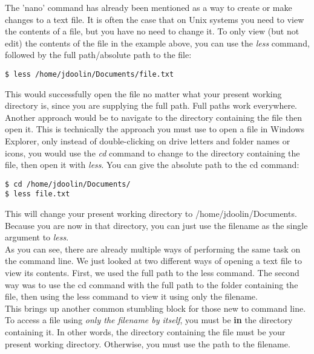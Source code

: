 The 'nano' command has already been mentioned as a way to create or make changes to a text file.  It is often the case that on Unix systems you need to view the contents of a file, but you have no need to change it.  To only view (but not edit) the contents of the file in the example above, you can use the \textit{less} command, followed by the full path/absolute path to the file:

\begin{verbatim}
$ less /home/jdoolin/Documents/file.txt
\end{verbatim}

This would successfully open the file no matter what your present working directory is, since you are supplying the full path.  Full paths work everywhere.\\

Another approach would be to navigate to the directory containing the file then open it.  This is technically the approach you must use to open a file in Windows Explorer, only instead of double-clicking on drive letters and folder names or icons, you would use the \textit{cd} command to change to the directory containing the file, then open it with \textit{less}.  You can give the absolute path to the cd command:

\begin{verbatim}
$ cd /home/jdoolin/Documents/
$ less file.txt
\end{verbatim}

This will change your present working directory to /home/jdoolin/Documents.  Because you are now in that directory, you can just use the filename as the single argument to \textit{less}.\\

As you can see, there are already multiple ways of performing the same task on the command line.  We just looked at two different ways of opening a text file to view its contents.  First, we used the full path to the less command.  The second way was to use the cd command with the full path to the folder containing the file, then using the less command to view it using only the filename.\\

This brings up another common stumbling block for those new to command line.  To access a file using \textit{only the filename by itself}, you must be \textbf{in} the directory containing it.  In other words, the directory containing the file must be your present working directory.  Otherwise, you must use the path to the filename.\\

